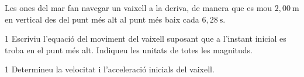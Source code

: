 Les ones del mar fan navegar un vaixell a la deriva, de manera que es mou $2,00\ \mathrm{m}$ en vertical des del punt més alt al punt més baix cada $6,28\ \mathrm{s}$.

\begin{apartat}{1}
Escriviu l'equació del moviment del vaixell suposant que a l'instant inicial es troba en el punt més alt. Indiqueu les unitats de totes les magnituds.
\end{apartat}

\begin{apartat}{1}
Determineu la velocitat i l'acceleració inicials del vaixell.
\end{apartat}
